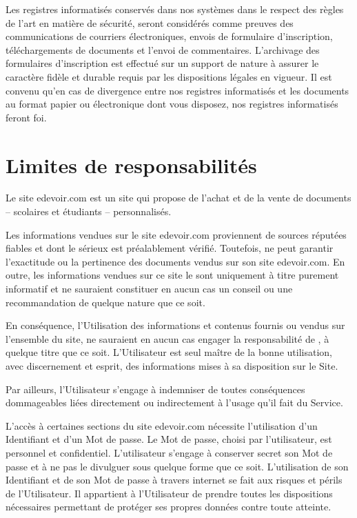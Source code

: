 Les registres informatisés conservés dans nos systèmes dans le respect des règles de l'art en matière de sécurité, seront considérés comme preuves des communications de courriers électroniques, envois de formulaire d'inscription, téléchargements de documents et l'envoi de commentaires. L'archivage des formulaires d'inscription est effectué sur un support de nature à assurer le caractère fidèle et durable requis par les dispositions légales en vigueur. Il est convenu qu'en cas de divergence entre nos registres informatisés et les documents au format papier ou électronique dont vous disposez, nos registres informatisés feront foi.

 
\section{Limites de responsabilités}

Le site edevoir.com est un site qui propose de l'achat et de la vente de documents -- scolaires et étudiants -- personnalisés.

Les informations vendues sur le site edevoir.com proviennent de sources réputées fiables et dont le sérieux est préalablement vérifié. Toutefois, \eDevoir ne peut garantir l'exactitude ou la pertinence des documents vendus sur son site edevoir.com. En outre, les informations vendues sur ce site le sont uniquement à titre purement informatif et ne sauraient constituer en aucun cas un conseil ou une recommandation de quelque nature que ce soit.

En conséquence, l'Utilisation des informations et contenus fournis ou vendus sur l'ensemble du site, ne sauraient en aucun cas engager la responsabilité de \eDevoir, à quelque titre que ce soit. L'Utilisateur est seul maître de la bonne utilisation, avec discernement et esprit, des informations mises à sa disposition sur le Site.

Par ailleurs, l’Utilisateur s’engage à indemniser \eDevoir de toutes conséquences dommageables liées directement ou indirectement à l'usage qu'il fait du Service.

L'accès à certaines sections du site edevoir.com nécessite l'utilisation d'un Identifiant et d'un Mot de passe. Le Mot de passe, choisi par l'utilisateur, est personnel et confidentiel. L'utilisateur s'engage à conserver secret son Mot de passe et à ne pas le divulguer sous quelque forme que ce soit. L'utilisation de son Identifiant et de son Mot de passe à travers internet se fait aux risques et périls de l'Utilisateur. Il appartient à l'Utilisateur de prendre toutes les dispositions nécessaires permettant de protéger ses propres données contre toute atteinte.

